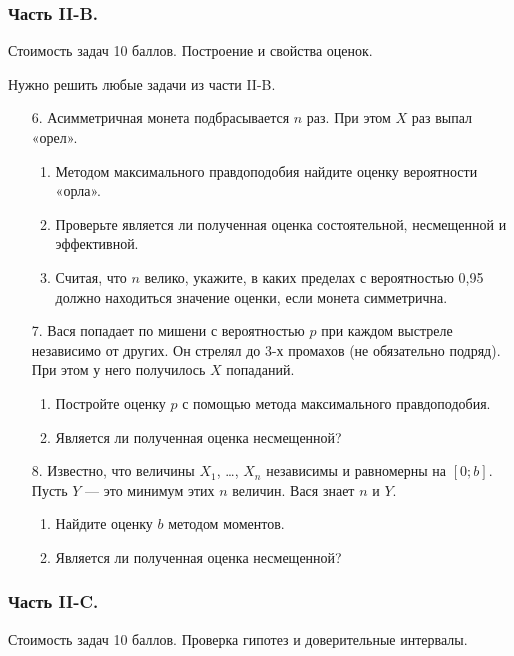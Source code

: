 \subsubsection*{Часть II-B.}

Стоимость задач 10 баллов. Построение и свойства оценок.

Нужно решить любые \textbf{} задачи из части II-B.

\begin{enumerate}
\item[6.] Асимметричная монета подбрасывается $n$ раз. При этом $X$ раз выпал «орел».
\begin{enumerate}
\item Методом максимального правдоподобия найдите оценку вероятности «орла».
\item Проверьте является ли полученная оценка состоятельной, несмещенной и эффективной.
\item Считая, что $n$ велико, укажите, в каких пределах с вероятностью 0,95 должно находиться значение оценки, если монета симметрична.
\end{enumerate}

\item[7.] Вася попадает по мишени с вероятностью $p$ при каждом выстреле независимо от других. Он стрелял до 3-х промахов (не обязательно подряд). При этом у него получилось $X$ попаданий.
\begin{enumerate}
\item Постройте оценку $p$ с помощью метода максимального правдоподобия.
\item Является ли полученная оценка несмещенной?
\end{enumerate}

\item[8.] Известно, что величины $X_{1}$, \ldots, $X_{n}$ независимы и равномерны на $[0;b]$. Пусть $Y$ — это минимум этих $n$ величин. Вася знает $n$ и $Y$.
\begin{enumerate}
\item Найдите оценку $b$ методом моментов.
\item Является ли полученная оценка несмещенной?
\end{enumerate}
\end{enumerate}

\subsubsection*{Часть II-C.}

Стоимость задач 10 баллов. Проверка гипотез и доверительные интервалы.

